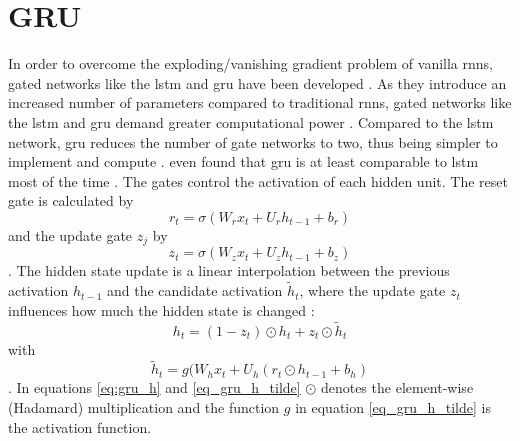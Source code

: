 \documentclass[12pt, a4paper, headinclude, twoside, plainheadsepline, open=right, numbers=noenddot, hidelinks, toc=listof, toc=bibliography]{scrreprt}
\begin{document}
\section{GRU}
\label{sec:gru}
In order to overcome the exploding/vanishing gradient problem of vanilla \acp{rnn}, gated networks like the \ac{lstm} \cite{hochreiterLongShortTermMemory1997} and \ac{gru} \cite{choLearningPhraseRepresentations2014} have been developed \cite{vanhoudtReviewLongShortterm2020}.
As they introduce an increased number of parameters compared to traditional \acp{rnn}, gated networks like the \ac{lstm} and \ac{gru} demand greater computational power \cite{deyGatevariantsGatedRecurrent2017}.
Compared to the \ac{lstm} network, \ac{gru} reduces the number of gate networks to two, thus being simpler to implement and compute \cite{choLearningPhraseRepresentations2014}.
 even found that \ac{gru} is at least comparable to \ac{lstm} most of the time \cite{chungEmpiricalEvaluationGated2014}.
The gates control the activation of each hidden unit.
The reset gate is calculated by
\begin{equation}
\label{eq:gru_reset}
r_t = \sigma (W_r x_t + U_r h_{t-1} + b_r)
\end{equation}
and the update gate $z_j$ by
\begin{equation}
\label{eq:gru_update}
z_t = \sigma (W_z x_t + U_z h_{t-1} + b_z)
\end{equation}
\cite{deyGatevariantsGatedRecurrent2017}.
The hidden state update is a linear interpolation between the previous activation $h_{t-1}$ and the candidate activation $\tilde{h}_t$, where the update gate $z_t$ influences how much the hidden state is changed \cite{chungEmpiricalEvaluationGated2014}:
\begin{equation}
\label{eq:gru_h}
h_t = (1-z_t) \odot h_t + z_t \odot \tilde{h}_t
\end{equation}
with
\begin{equation}
\label{eq_gru_h_tilde}
\tilde{h}_t = g(W_h x_t + U_h (r_t \odot h_{t-1} + b_h)
\end{equation}
.
In equations \ref{eq:gru_h} and \ref{eq_gru_h_tilde} $\odot$ denotes the element-wise (Hadamard) multiplication and the function $g$ in equation \ref{eq_gru_h_tilde} is the activation function.
\end{document}
